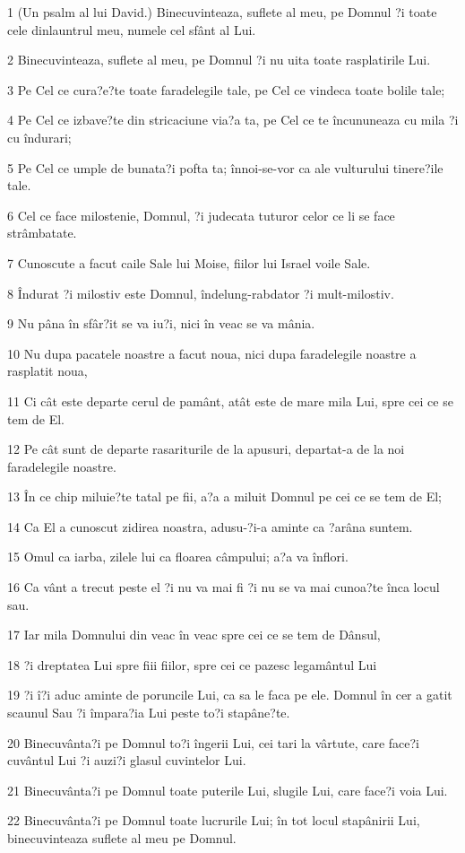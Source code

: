 \par 1 (Un psalm al lui David.) Binecuvinteaza, suflete al meu, pe Domnul ?i toate cele dinlauntrul meu, numele cel sfânt al Lui.
\par 2 Binecuvinteaza, suflete al meu, pe Domnul ?i nu uita toate rasplatirile Lui.
\par 3 Pe Cel ce cura?e?te toate faradelegile tale, pe Cel ce vindeca toate bolile tale;
\par 4 Pe Cel ce izbave?te din stricaciune via?a ta, pe Cel ce te încununeaza cu mila ?i cu îndurari;
\par 5 Pe Cel ce umple de bunata?i pofta ta; înnoi-se-vor ca ale vulturului tinere?ile tale.
\par 6 Cel ce face milostenie, Domnul, ?i judecata tuturor celor ce li se face strâmbatate.
\par 7 Cunoscute a facut caile Sale lui Moise, fiilor lui Israel voile Sale.
\par 8 Îndurat ?i milostiv este Domnul, îndelung-rabdator ?i mult-milostiv.
\par 9 Nu pâna în sfâr?it se va iu?i, nici în veac se va mânia.
\par 10 Nu dupa pacatele noastre a facut noua, nici dupa faradelegile noastre a rasplatit noua,
\par 11 Ci cât este departe cerul de pamânt, atât este de mare mila Lui, spre cei ce se tem de El.
\par 12 Pe cât sunt de departe rasariturile de la apusuri, departat-a de la noi faradelegile noastre.
\par 13 În ce chip miluie?te tatal pe fii, a?a a miluit Domnul pe cei ce se tem de El;
\par 14 Ca El a cunoscut zidirea noastra, adusu-?i-a aminte ca ?arâna suntem.
\par 15 Omul ca iarba, zilele lui ca floarea câmpului; a?a va înflori.
\par 16 Ca vânt a trecut peste el ?i nu va mai fi ?i nu se va mai cunoa?te înca locul sau.
\par 17 Iar mila Domnului din veac în veac spre cei ce se tem de Dânsul,
\par 18 ?i dreptatea Lui spre fiii fiilor, spre cei ce pazesc legamântul Lui
\par 19 ?i î?i aduc aminte de poruncile Lui, ca sa le faca pe ele. Domnul în cer a gatit scaunul Sau ?i împara?ia Lui peste to?i stapâne?te.
\par 20 Binecuvânta?i pe Domnul to?i îngerii Lui, cei tari la vârtute, care face?i cuvântul Lui ?i auzi?i glasul cuvintelor Lui.
\par 21 Binecuvânta?i pe Domnul toate puterile Lui, slugile Lui, care face?i voia Lui.
\par 22 Binecuvânta?i pe Domnul toate lucrurile Lui; în tot locul stapânirii Lui, binecuvinteaza suflete al meu pe Domnul.

